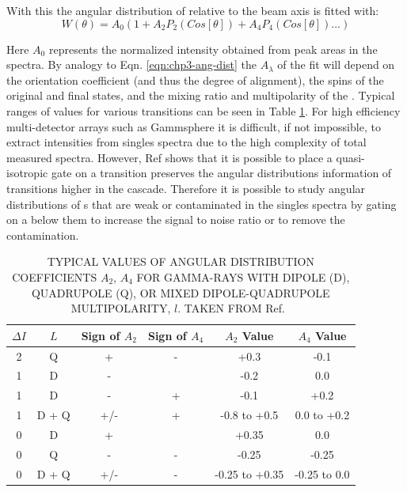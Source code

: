With this the angular distribution of \gr{} relative to the beam axis is fitted with:
\begin{equation}
\label{eqn:chp3-ang-dist-fit}
W(\theta{}) = A_{0}(1 + A_{2} P_{2}(Cos[\theta{}]) + A_{4} P_{4}(Cos[\theta{}]) ...)
\end{equation}

Here $A_{0}$ represents the normalized intensity obtained from peak areas in the \gr{} spectra. By analogy to Eqn. \ref{eqn:chp3-ang-dist} the $A_{\lambda{}}$ of the fit will depend on the orientation coefficient (and thus the degree of alignment), the spins of the original and final states, and the mixing ratio and multipolarity of the \gr{}. Typical ranges of values for various transitions can be seen in Table \ref{tbl:chp3-ang-dis-fit-ranges}. For high efficiency multi-detector arrays such as Gammsphere it is difficult, if not impossible, to extract \gr{} intensities from singles spectra due to the high complexity of total measured spectra. However, Ref \cite{angDistGates} shows that it is possible to place a quasi-isotropic gate on a transition preserves the angular distributions information of transitions higher in the cascade. Therefore it is possible to study angular distributions of \gr{}s that are weak or contaminated in the singles spectra by gating on a \gr{} below them to increase the signal to noise ratio or to remove the contamination.

\begin{table}[t]
\setlength{\abovecaptionskip}{-2pt}   %
\setlength{\belowcaptionskip}{0.5pt}
\caption[\uppercase{Typical values of angular distribution coefficients $A_2$, $A_4$ for gamma-rays with Dipole (D), Quadrupole (Q), or mixed Dipole-Quadrupole Multipolarity, $l$.}]{\uppercase{Typical values of angular distribution coefficients $A_2$, $A_4$ for gamma-rays with Dipole (D), Quadrupole (Q), or mixed Dipole-Quadrupole Multipolarity, $l$.  Taken from} Ref.~\cite{angDistAVals}} \label{tbl:chp3-ang-dis-fit-ranges}
\centering
\begin{tabular}{c@{\hskip 0.3in}c@{\hskip 0.2in}c@{\hskip 0.15in}c@{\hskip 0.2in}c@{\hskip 0.3in}c}
\hline\hline
$\Delta I$ & $L$ & Sign of $A_2$ & Sign of $A_4$ & $A_2$ Value & $A_4$ Value\\
\hline
2 & Q & + & - & +0.3 & -0.1\\
1 & D & - &  & -0.2 & 0.0\\
1 & D & - & + & -0.1 & +0.2\\
1 & D + Q & +/- & + & -0.8 to +0.5 & 0.0 to +0.2\\
0 & D & + &  & +0.35 & 0.0\\
0 & Q & - & - & -0.25 & -0.25\\
0 & D + Q & +/- & - & -0.25 to +0.35 & -0.25 to 0.0\\
\hline\hline
\end{tabular}
\end{table}

